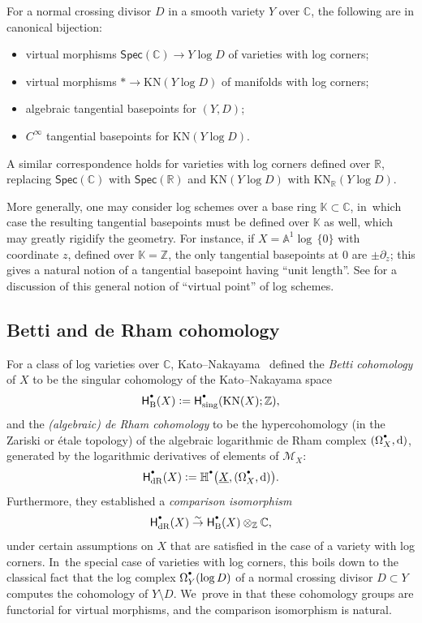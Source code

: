\documentclass[10pt]{amsart}
\let\oldbullet\bullet
\renewcommand{\bullet}{{\raisebox{1pt}{$\scriptscriptstyle\oldbullet$}}}
\newcommand{\rbirac}[1]{\bigl(#1\bigr)}
\newcommand{\bHH}[2][\bullet]{\mathbb{H}^{#1}\rbirac{#2}}
\theoremstyle{definition}
\theoremstyle{remark}
\newenvironment{remark}
  {\pushQED{\qed}\renewcommand{\qedsymbol}{$\lozenge$}\remarkx}
  {\popQED\endremarkx}
\let\defn\emph
\newcommand{\CC}{\mathbb{C}}
\newcommand{\KK}{\mathbb{K}}
\newcommand{\RR}{\mathbb{R}}
\newcommand{\ZZ}{\mathbb{Z}}
\newcommand{\AF}{\mathbb{A}}
\newcommand{\logcyl}{\AF^1 \log\, \{0\}}
\newcommand{\defas}{\mathrel{\mathop:}=}
\newcommand{\rbrac}[1]{\left(#1\right)}
\newcommand{\cM}{\mathscr{M}}
\newcommand{\dd}{\mathrm{d}}
\newcommand{\cvf}[1]{\partial_{#1}}
\newcommand{\uX}{\underline{X}}
\newcommand{\KN}[1]{\mathrm{KN}(#1)}
\newcommand{\KNR}[1]{\mathrm{KN}_\RR\rbrac{#1}}
\newcommand{\Spec}[1]{\mathsf{Spec}(#1)}
\newcommand{\HdR}[2][\bullet]{\mathsf{H}_{\mathrm{dR}}^{#1}(#2)}
\newcommand{\HB}[2][\bullet]{\mathsf{H}_{\mathrm{B}}^{#1}(#2)}
\newcommand{\forms}[2][\bullet]{\Omega^{#1}_{#2}}
\begin{document}
\begin{proposition}\label{prop:basepoints-alg-vs-diff}
For a normal crossing divisor $D$ in a smooth variety $Y$ over $\CC$, the following are in canonical bijection:
\begin{itemize}
\item virtual morphisms $\Spec{\CC} \to Y \log D$ of varieties with log corners;
\item virtual morphisms $* \to \KN{Y\log D}$ of manifolds with log corners;
\item algebraic tangential basepoints for $(Y,D)$;
\item $C^\infty$ tangential basepoints for $\KN{Y \log D}$.
\end{itemize}
\end{proposition}

A similar correspondence holds for varieties with log corners defined over $\RR$, replacing $\Spec{\CC}$ with $\Spec{\RR}$ and $\KN{Y\log D}$ with $\KNR{Y\log D}$.

\begin{remark}\label{rmk:basepoints-over-Z}
More generally, one may consider log schemes over a base ring $\KK\subset \CC$, in~which case the resulting tangential basepoints must be defined over $\KK$ as well, which may greatly rigidify the geometry. For instance, if $X = \logcyl$ with coordinate $z$, defined over $\KK = \ZZ$, the only tangential basepoints at $0$ are $\pm\cvf{z}$; this gives a natural notion of a tangential basepoint having ``unit length''. See \cite{DPP:WeakMorphisms} for a discussion of this general notion of ``virtual point'' of log schemes.
\end{remark}

\subsection{Betti and de Rham cohomology}
For a class of log varieties over $\CC$, Kato--Nakayama~\cite{KatoNakayama} defined the \defn{Betti cohomology} of $X$ to be the singular cohomology of the Kato--Nakayama space
\[
\HB{X} \defas \mathsf{H}^\bullet_{\mathrm{sing}}(\KN{X};\ZZ),
\]
and the \defn{(algebraic) de Rham cohomology} to be the hypercohomology (in the Zariski or étale topology) of the algebraic logarithmic de Rham complex $(\forms{X},\dd)$, generated by the logarithmic derivatives of elements of $\cM_X$:
\[
\HdR{X} \defas \bHH{\uX,(\forms{X},\dd)}.
\]
Furthermore, they established a \defn{comparison isomorphism}
\begin{align}
\HdR{X} \stackrel{\sim}{\to} \HB{X} \otimes_\ZZ \CC, \label{eq:comparison}
\end{align}
under certain assumptions on $X$ that are satisfied in the case of a variety with log corners. In~the special case of varieties with log corners, this boils down to the classical fact that the log complex $\forms{Y}(\log D)$ of a normal crossing divisor $D \subset Y$ computes the cohomology of $Y \setminus D$. We~prove in \cite{DPP:WeakMorphisms} that these cohomology groups are functorial for virtual morphisms, and the comparison isomorphism is natural.
\end{document}
